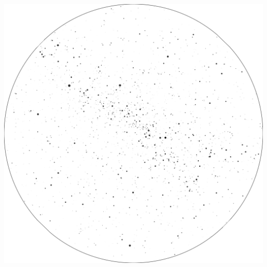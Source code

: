 \documentclass{./SAS-class-skygen}
\begin{document}
	\vspace{0.5cm}
    \begin{center}
    \includegraphics[width=\textwidth]{./pics/skychart44.png}
    \end{center}
    
    
\end{document}

